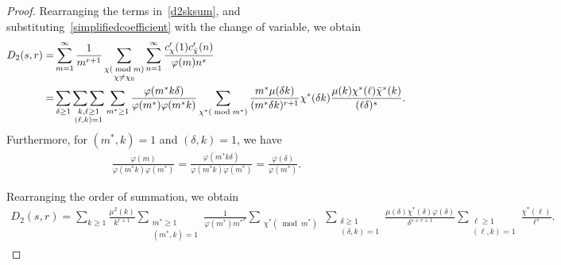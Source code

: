 \documentclass[12pt, oneside,reqno]{amsart}
\numberwithin{equation}{section}
\begin{document}
\begin{proof}
\noindent
Rearranging the terms in~\eqref{d2sksum}, and substituting~\eqref{simplifiedcoefficient} with the change of variable, we obtain
\begin{align*}
D_2(s,r)
=&\sum_{m=1}^{\infty}\frac{1}{m^{r+1}}\sum_{\substack{\chi(\bmod{m})\\\chi\ne\chi_0}}\sum_{n=1}^{\infty}\frac{c'_{\chi}(1)c'_{\Bar{\chi}}(n)}{\varphi(m)n^{s}}\\
=&\sum_{\delta\geq 1}\mathop{\sum\sum}_{\substack{k,\ell\geq 1\\(\ell,k)=1}}\sum_{m^*\geq 1}\frac{\varphi(m^*k\delta)}{\varphi(m^*)\varphi(m^*k)}\sum_{\chi^*(\bmod{m^*})}\frac{m^*\mu(\delta k)}{(m^*\delta k)^{r+1}}\chi^*(\delta k)\frac{\mu(k)\chi^*(\ell)\Bar{\chi}^*(k)}{(\ell\delta)^s}.
\end{align*}
\noindent
Furthermore, for $(m^*,k)=1$ and $(\delta,k)=1$, we have
\begin{align*}
\frac{\varphi(m)}{\varphi(m^*k)\varphi(m^*)}
=\frac{\varphi(m^*k\delta)}{\varphi(m^*k)\varphi(m^*)}
=\frac{\varphi(\delta)}{\varphi(m^*)}.
\end{align*}

\noindent
Rearranging the order of summation, we obtain
\begin{align*}
D_2(s,r)
=\sum_{k\geq 1}\frac{\mu^2(k)}{k^{r+1}}\sum_{\substack{m^*\geq 1\\ ({m^*},k)=1}}\frac{1}{\varphi(m^{*}){m^*}^{r}}\sum_{\substack{\chi^*(\bmod m^*)}}\sum_{\substack{\delta\geq 1\\(\delta,k)=1}}\frac{\mu(\delta)\chi^*(\delta)\varphi(\delta)}{\delta^{s+r+1}}\sum_{\substack{\ell\geq 1\\(\ell,k)=1}}\frac{\chi^{*}(\ell)}{\ell^s}.
\end{align*}


\end{proof}
\end{document}
